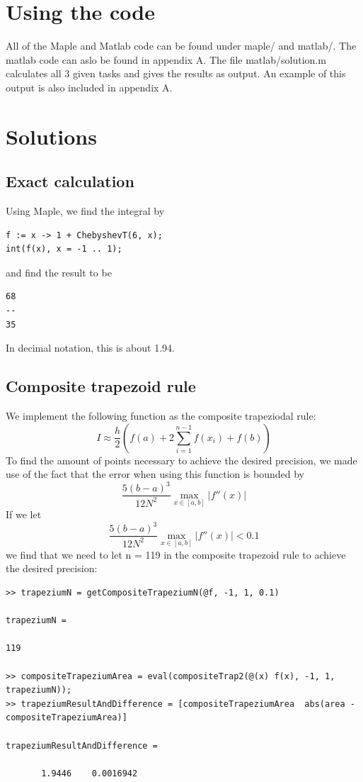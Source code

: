 \documentclass[11pt, a4paper, titlepage, openright]{article}
\begin{document}
\section{Using the code}
    All of the Maple and Matlab code can be found under maple/ and matlab/. The matlab code can aslo be found in appendix A.
    The file matlab/solution.m calculates all 3 given tasks and gives the results as output. An example of this output is also included in appendix A.

\newpage

\section{Solutions}
\subsection{Exact calculation}
Using Maple, we find the integral by

\begin{lstlisting}
f := x -> 1 + ChebyshevT(6, x);
int(f(x), x = -1 .. 1);
\end{lstlisting}
and find the result to be
\begin{lstlisting}
68
--
35
\end{lstlisting}
In decimal notation, this is about 1.94.


\subsection{Composite trapezoid rule}
We implement the following function as the composite trapeziodal rule:
\[ I \approx \frac{h}{2} (f(a) + 2 \sum_{i=1}^{n-1} f(x_i) + f(b)) \]
To find the amount of points necessary to achieve the desired precision, we made use of the fact that the error when using this function is bounded by
\[ \frac{5(b-a)^3}{12 N^2} \max_{x \in [a, b]} |f''(x)| \]
If we let
\[ \frac{5(b-a)^3}{12 N^2} \max_{x \in [a, b]} |f''(x)| < 0.1 \]
we find that we need to let n = 119 in the composite trapezoid rule to achieve the desired precision:
\begin{lstlisting}
>> trapeziumN = getCompositeTrapeziumN(@f, -1, 1, 0.1)

trapeziumN =

119

>> compositeTrapeziumArea = eval(compositeTrap2(@(x) f(x), -1, 1, trapeziumN));
>> trapeziumResultAndDifference = [compositeTrapeziumArea  abs(area - compositeTrapeziumArea)]

trapeziumResultAndDifference =

       1.9446    0.0016942
\end{lstlisting}
\end{document}
